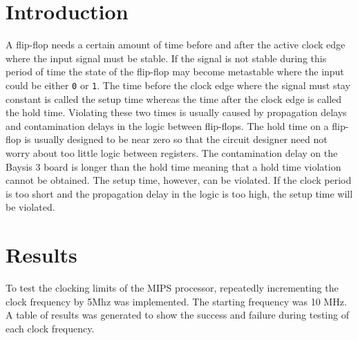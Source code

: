 \documentclass[CMPE]{../KGCOEReport}
\def\code#1{\texttt{#1}}
\begin{document}
    \maketitle
    \section*{Introduction}

    A flip-flop needs a certain amount of time before and after the active
    clock edge where the input signal must be stable. If the signal is not
    stable during this period of time the state of the flip-flop may become
    metastable where the input could be either \code{0} or \code{1}. The
    time before the clock edge where the signal must stay constant is called
    the setup time whereas the time after the clock edge is called the hold
    time. Violating these two times is usually caused by propagation delays
    and contamination delays in the logic between flip-flops. The hold time
    on a flip-flop is usually designed to be near zero so that the circuit
    designer need not worry about too little logic between registers. The 
    contamination delay on the Baysis 3 board is longer than the hold time
    meaning that a hold time violation cannot be obtained. The setup time,
    however, can be violated. If the clock period is too short and the 
    propagation delay in the logic is too high, the setup time will be violated.

    \section*{Results}
    
    To test the clocking limits of the MIPS processor, repeatedly incrementing
    the clock frequency by 5Mhz was implemented. The starting frequency was
    10 MHz.
    \\
    
    A table of results was generated to show the success and failure during
    testing of each clock frequency.
    
\end{document}
